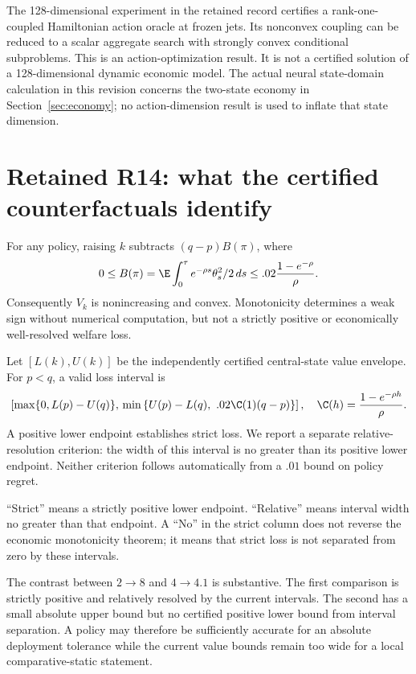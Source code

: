The 128-dimensional experiment in the retained record certifies a rank-one-coupled Hamiltonian action oracle at frozen jets. Its nonconvex coupling can be reduced to a scalar aggregate search with strongly convex conditional subproblems. This is an action-optimization result. It is not a certified solution of a 128-dimensional dynamic economic model. The actual neural state-domain calculation in this revision concerns the two-state economy in Section~\ref{sec:economy}; no action-dimension result is used to inflate that state dimension.

\section{Retained R14: what the certified counterfactuals identify}\label{sec:economics}
For any policy, raising $k$ subtracts $(q-p)B(\pi)$, where
\[
 0\leq B(\pi)=\E\int_0^\tau e^{-\rho s}\theta_s^2/2\,ds
 \leq .02\frac{1-e^{-\rho}}{\rho}.
\]
Consequently $V_k$ is nonincreasing and convex. Monotonicity determines a weak sign without numerical computation, but not a strictly positive or economically well-resolved welfare loss.

Let $[L(k),U(k)]$ be the independently certified central-state value envelope. For $p<q$, a valid loss interval is
\begin{equation}
 \left[\max\{0,L(p)-U(q)\},\\
 \min\left\{U(p)-L(q),\ .02\C(1)(q-p)\right\}\right],
 \quad \C(h)=\frac{1-e^{-\rho h}}{\rho}.
 \label{eq:welfare}
\end{equation}
A positive lower endpoint establishes strict loss. We report a separate relative-resolution criterion: the width of this interval is no greater than its positive lower endpoint. Neither criterion follows automatically from a $.01$ bound on policy regret.

\begin{table}[t]\centering\small
\caption{Certified welfare losses when the adjustment price rises}\label{tab:welfare}

\par\smallskip\footnotesize ``Strict'' means a strictly positive lower endpoint. ``Relative'' means interval width no greater than that endpoint. A ``No'' in the strict column does not reverse the economic monotonicity theorem; it means that strict loss is not separated from zero by these intervals.
\end{table}

The contrast between $2\to8$ and $4\to4.1$ is substantive. The first comparison is strictly positive and relatively resolved by the current intervals. The second has a small absolute upper bound but no certified positive lower bound from interval separation. A policy may therefore be sufficiently accurate for an absolute deployment tolerance while the current value bounds remain too wide for a local comparative-static statement.

